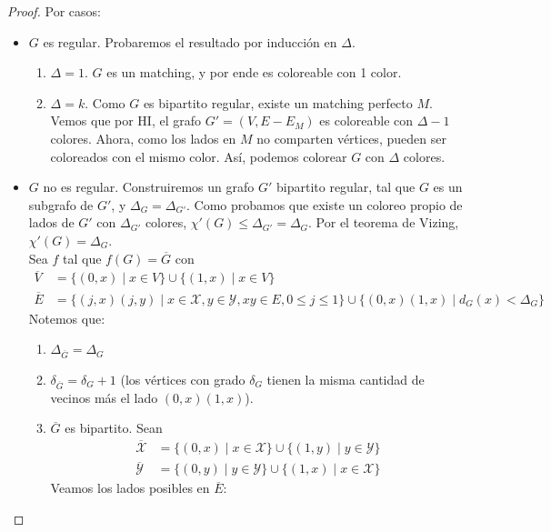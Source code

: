 \begin{proof}
Por casos:
\begin{itemize}
    \item $G$ es regular. Probaremos el resultado por inducción en $\Delta$.
    \begin{enumerate}
        \item $\Delta = 1$. $G$ es un matching, y por ende es coloreable con 1 color.
        \item $\Delta = k$. Como $G$ es bipartito regular, existe un matching perfecto $M$. Vemos que por HI, el grafo $G' = (V, E - E_M)$ es coloreable con $\Delta - 1$ colores. Ahora, como los lados en $M$ no comparten vértices, pueden ser coloreados con el mismo color. Así, podemos colorear $G$ con $\Delta$ colores.
    \end{enumerate}
    \item $G$ no es regular. Construiremos un grafo $G'$ bipartito regular, tal que $G$ es un subgrafo de $G'$, y $\Delta_G = \Delta_{G'}$. Como probamos que existe un coloreo propio de lados de $G'$ con $\Delta_{G'}$ colores, $\chi'(G) \le \Delta_{G'} = \Delta_G$. Por el teorema de Vizing, $\chi'(G) = \Delta_G$.\\
    Sea $f$ tal que $f(G) = \overline{G}$ con
    \begin{align}
        \overline{V} &= \{ (0,x) \mid x \in V \} \cup \{ (1,x) \mid x \in V \}\\
        \overline{E} &= \{ (j,x)(j,y) \mid x \in \mathcal{X}, y \in \mathcal{Y}, xy \in E, 0 \le j \le 1 \}
        \cup \{ (0,x)(1,x) \mid d_G(x) < \Delta_G\}
    \end{align}
    Notemos que:
    \begin{enumerate}
        \item $\Delta_{\overline{G}} = \Delta_G$
        \item $\delta_{\overline{G}} = \delta_G + 1$ (los vértices con grado $\delta_G$ tienen la misma cantidad de vecinos más el lado $(0,x)(1,x)$).
        \item $\overline{G}$ es bipartito. Sean
        \begin{align}
            \overline{\mathcal{X}} &= \{ (0,x) \mid x \in \mathcal{X} \} \cup \{ (1,y) \mid y \in \mathcal{Y} \}\\
            \overline{\mathcal{Y}} &= \{ (0,y) \mid y \in \mathcal{Y} \} \cup \{ (1,x) \mid x \in \mathcal{X} \}
        \end{align}
        Veamos los lados posibles en $\overline{E}$:
        \begin{itemize}

\end{itemize}
\end{enumerate}
\end{itemize}
\end{proof}
